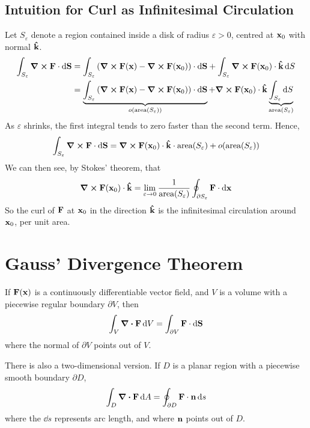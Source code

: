 \documentclass{article}
\begin{document}
\subsection{Intuition for Curl as Infinitesimal Circulation}
Let $S_\varepsilon$ denote a region contained inside a disk of radius $\varepsilon > 0$, centred at $\vb x_0$ with normal $\vu{k}$.
\begin{align*}
    \int_{S_\varepsilon} \curl{\vb F} \cdot \dd{\vb S} & = \int_{S_\varepsilon} \left( \curl{\vb F(\vb x)} - \curl{\vb F(\vb x_0)} \right) \cdot \dd{\vb S} + \int_{S_\varepsilon} \curl{\vb F(\vb x_0)} \cdot \vu k \dd{S}                                                                                        \\
                                                       & = \underbrace{\int_{S_\varepsilon} \left( \curl{\vb F(\vb x)} - \curl{\vb F(\vb x_0)} \right) \cdot \dd{\vb S}}_{o(\text{area}(S_\varepsilon))} + \curl{\vb F(\vb x_0)} \cdot \vu k \underbrace{\int_{S_\varepsilon} \dd{S}}_{\text{area}(S_\varepsilon)} \\
\end{align*}
As $\varepsilon$ shrinks, the first integral tends to zero faster than the second term. Hence,
\[ \int_{S_\varepsilon} \curl{\vb F} \cdot \dd{\vb S} =  \curl{\vb F(\vb x_0)} \cdot \vu k \cdot \text{area}(S_\varepsilon) + o(\text{area}(S_\varepsilon)) \]
We can then see, by Stokes' theorem, that
\[ \curl{\vb F(\vb x_0)} \cdot \vu k = \lim_{\varepsilon \to 0} \frac{1}{\text{area}(S_\varepsilon)} \oint_{\partial S_\varepsilon} \vb F \cdot \dd{\vb x} \]
So the curl of $\vb F$ at $\vb x_0$ in the direction $\vu k$ is the infinitesimal circulation around $\vb x_0$, per unit area.

\section{Gauss' Divergence Theorem}
\begin{proposition}
    If $\vb F(\vb x)$ is a continuously differentiable vector field, and $V$ is a volume with a piecewise regular boundary $\partial V$, then
    \[ \int_V \div{\vb F} \dd{V} = \int_{\partial V} \vb F \cdot \dd{\vb S} \]
    where the normal of $\partial V$ points out of $V$.
\end{proposition}
\noindent There is also a two-dimensional version. If $D$ is a planar region with a piecewise smooth boundary $\partial D$,
\[ \int_D \div{\vb F} \dd{A} = \oint_{\partial D} \vb F \cdot \vb n \dd{s} \]
where the $\dd{s}$ represents arc length, and where $\vb n$ points out of $D$.
\end{document}
